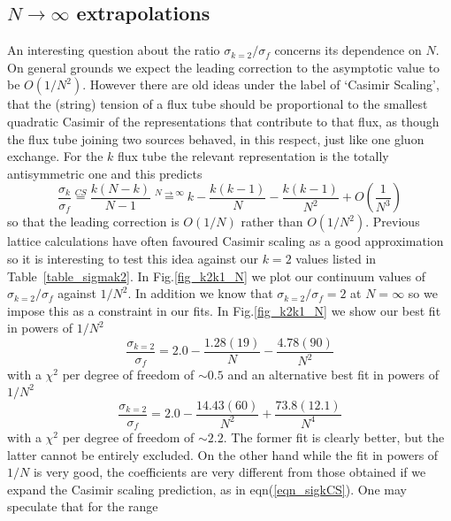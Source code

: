 \documentclass[12pt]{article}
\begin{document}
%
%
\subsection{$N\to\infty$ extrapolations}
\label{subsection_kstringlargeN} 

An interesting question about the ratio $\sigma_{k=2}/\sigma_f$ concerns its dependence
on $N$. On general grounds we expect the leading correction to the asymptotic value
to be $O(1/N^2)$. However there are old ideas under the label of `Casimir Scaling',
that the (string) tension of a flux tube should be proportional to the smallest quadratic
Casimir of the representations that contribute to that flux, as though the flux tube
joining two sources behaved, in this respect, just like one gluon exchange. For
the $k$ flux tube the relevant representation is the totally antisymmetric one and this
predicts
%
\begin{equation}
 \frac{\sigma_k}{\sigma_f}
 \stackrel{CS}{=}
 \frac{k(N-k)}{N-1}
 \stackrel{N\to\infty}{=}
  k-\frac{k(k-1)}{N}-\frac{k(k-1)}{N^2} +O\left(\frac{1}{N^3}\right)
  \label{eqn_sigkCS}
\end{equation}
%
so that the leading correction is $O(1/N)$ rather than $O(1/N^2)$. Previous lattice
calculations have often favoured Casimir scaling as a good approximation
%
\cite{CSlattice}
%
so it is interesting to test this idea against our $k=2$ values listed in Table~\ref{table_sigmak2}.
In Fig.\ref{fig_k2k1_N} we plot our continuum values of  $\sigma_{k=2}/\sigma_f$ against $1/N^2$.
In addition we know that $\sigma_{k=2}/\sigma_f=2$ at $N=\infty$ so we impose this as a constraint
in our fits. In Fig.\ref{fig_k2k1_N} we show our best fit in powers of $1/N^2$
%
\begin{equation}
 \frac{\sigma_{k=2}}{\sigma_f}
 =
 2.0-\frac{1.28(19)}{N}-\frac{4.78(90)}{N^2}
  \label{eqn_k2k1N}
\end{equation}
%
with a $\chi^2$ per degree of freedom of $\sim 0.5$ and an alternative best fit in powers of $1/N^2$
%
\begin{equation}
 \frac{\sigma_{k=2}}{\sigma_f}
 =
 2.0-\frac{14.43(60)}{N^2}+\frac{73.8(12.1)}{N^4}
  \label{eqn_k2k1NN}
\end{equation}
%
with a $\chi^2$ per degree of freedom of $\sim 2.2$. The former fit is clearly better, but the
latter cannot be entirely excluded. On the other hand while the fit in powers of $1/N$ is very good,
the coefficients are very different from those obtained if we expand the Casimir scaling
prediction, as in eqn(\ref{eqn_sigkCS}). One may speculate that for the range
\end{document}
